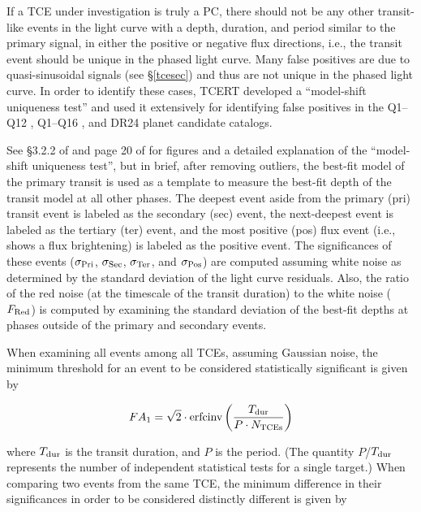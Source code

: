 If a TCE under investigation is truly a PC, there should not be any other transit-like events in the light curve with a depth, duration, and period similar to the primary signal, in either the positive or negative flux directions, i.e., the transit event should be unique in the phased light curve. Many false positives are due to quasi-sinusoidal signals (see \S\ref{tcesec}) and thus are not unique in the phased light curve. In order to identify these cases, TCERT developed a ``model-shift uniqueness test'' and used it extensively for identifying false positives in the Q1--Q12 \citep{Rowe2015a}, Q1--Q16 \citep{Mullally2015cat}, and DR24 \citep{Coughlin2016} planet candidate catalogs.

See \S3.2.2 of \citet{Rowe2015a} and page 20 of \citet{Coughlin2014b} for figures and a detailed explanation of the ``model-shift uniqueness test'', but in brief, after removing outliers, the best-fit model of the primary transit is used as a template to measure the best-fit depth of the transit model at all other phases. The deepest event aside from the primary (pri) transit event is labeled as the secondary (sec) event, the next-deepest event is labeled as the tertiary (ter) event, and the most positive (pos) flux event (i.e., shows a flux brightening) is labeled as the positive event. The significances of these events ($\sigma_{\rm Pri}$, $\sigma_{\rm Sec}$, $\sigma_{\rm Ter}$, and $\sigma_{\rm Pos}$) are computed assuming white noise as determined by the standard deviation of the light curve residuals. Also, the ratio of the red noise (at the timescale of the transit duration) to the white noise ($F_{\rm Red}$) is computed by examining the standard deviation of the best-fit depths at phases outside of the primary and secondary events.  

When examining all events among all TCEs, assuming Gaussian noise, the minimum threshold for an event to be considered statistically significant is given by

\begin{equation}
    FA_{1} = \sqrt{2}\cdot \textrm{erfcinv}\left(\frac{T_{\rm dur}}{P \cdot N_{\rm TCEs}}\right)
\end{equation}

\noindent where $T_{\rm dur}$ is the transit duration, and $P$ is the period. (The quantity $P$/$T_{\rm dur}$ represents the number of independent statistical tests for a single target.) When comparing two events from the same TCE, the minimum difference in their significances in order to be considered distinctly different is given by

